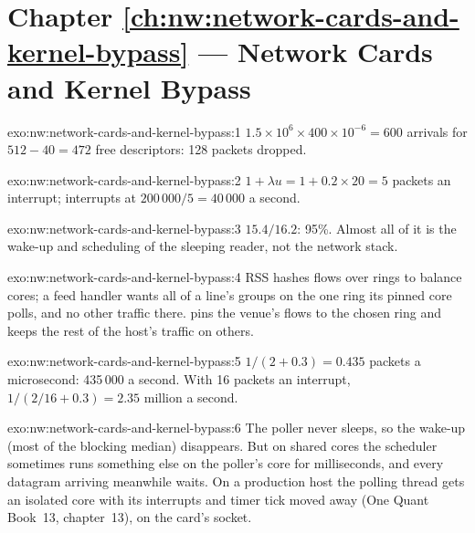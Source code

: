 \section*{Chapter \ref{ch:nw:network-cards-and-kernel-bypass} --- Network Cards and Kernel Bypass}

\begin{solution}{exo:nw:network-cards-and-kernel-bypass:1}
$1.5 \times 10^6 \times 400 \times 10^{-6} = 600$ arrivals for $512 - 40 = 472$ free descriptors: 128 packets dropped.
\end{solution}

\begin{solution}{exo:nw:network-cards-and-kernel-bypass:2}
$1 + \lambda u = 1 + 0.2 \times 20 = 5$ packets an interrupt; interrupts at $200\,000 / 5 = 40\,000$ a second.
\end{solution}

\begin{solution}{exo:nw:network-cards-and-kernel-bypass:3}
$15.4 / 16.2$: 95\%. Almost all of it is the wake-up and scheduling of the sleeping reader, not the network stack.
\end{solution}

\begin{solution}{exo:nw:network-cards-and-kernel-bypass:4}
RSS hashes flows over rings to balance cores; a feed handler wants all of a line's groups on the one ring its pinned core polls, and no
other traffic there.  pins the venue's flows to the chosen ring and keeps the rest of the host's traffic on others.
\end{solution}

\begin{solution}{exo:nw:network-cards-and-kernel-bypass:5}
$1/(2 + 0.3) = 0.435$ packets a microsecond: 435\,000 a second. With 16 packets an interrupt, $1/(2/16 + 0.3) = 2.35$ million a second.
\end{solution}

\begin{solution}{exo:nw:network-cards-and-kernel-bypass:6}
The poller never sleeps, so the wake-up (most of the blocking median) disappears. But on shared cores the scheduler sometimes runs
something else on the poller's core for milliseconds, and every datagram arriving meanwhile waits. On a production host the polling
thread gets an isolated core with its interrupts and timer tick moved away (One Quant Book~13, chapter~13), on the card's socket.
\end{solution}

